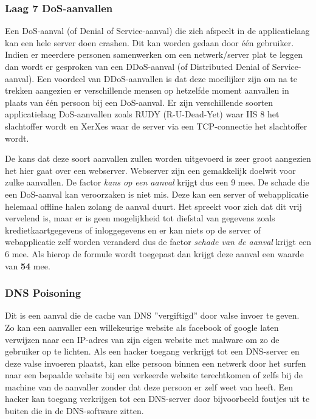 \documentclass[pdftex,a4paper,12pt]{report}
\begin{document}
\subsubsection{Laag 7 DoS-aanvallen}
Een DoS-aanval (of Denial of Service-aanval) die zich afspeelt in de applicatielaag kan een hele server doen crashen. Dit kan worden gedaan door één gebruiker. Indien er meerdere personen samenwerken om een netwerk/server plat te leggen dan wordt er gesproken van een DDoS-aanval (of Distributed Denial of Service-aanval). Een voordeel van DDoS-aanvallen is dat deze moeilijker zijn om na te trekken aangezien er verschillende mensen op hetzelfde moment aanvallen in plaats van één persoon bij een DoS-aanval. \citep{Blagov2014} Er zijn verschillende soorten applicatielaag DoS-aanvallen zoals RUDY (R-U-Dead-Yet) waar IIS 8 het slachtoffer wordt en XerXes waar de server via een TCP-connectie het slachtoffer wordt. \newline

De kans dat deze soort aanvallen zullen worden uitgevoerd is zeer groot aangezien het hier gaat over een webserver. Webserver zijn een gemakkelijk doelwit voor zulke aanvallen. De factor \textit{kans op een aanval} krijgt dus een 9 mee. De schade die een DoS-aanval kan veroorzaken is niet mis.  Deze kan een server of webapplicatie helemaal offline halen zolang de aanval duurt. Het spreekt voor zich dat dit vrij vervelend is, maar er is geen mogelijkheid tot diefstal van gegevens zoals kredietkaartgegevens of inloggegevens en er kan niets op de server of webapplicatie zelf worden veranderd dus de factor \textit{schade van de aanval} krijgt een 6 mee. Als hierop de formule wordt toegepast dan krijgt deze aanval een waarde van \textbf{54} mee.

\subsubsection{DNS Poisoning}
Dit is een aanval die de cache van DNS ''vergiftigd'' door valse invoer te geven. Zo kan een aanvaller een willekeurige website als facebook of google laten verwijzen naar een IP-adres van zijn eigen website met malware om zo de gebruiker op te lichten. Als een hacker toegang verkrijgt tot een DNS-server en deze valse invoeren plaatst, kan elke persoon binnen een netwerk door het surfen naar een bepaalde website bij een verkeerde website terechtkomen of zelfs bij de machine van de aanvaller zonder dat deze persoon er zelf weet van heeft. Een hacker kan toegang verkrijgen tot een DNS-server door bijvoorbeeld foutjes uit te buiten die in de DNS-software zitten. \citep{Hoffm2015} \newline
\end{document}
